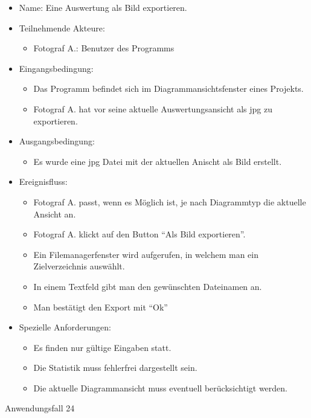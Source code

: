 \begin{itemize}
\item Name: Eine Auswertung als Bild exportieren.
\item Teilnehmende Akteure:
\begin{itemize}
\item Fotograf A.: Benutzer des Programms
\end{itemize}
\item Eingangsbedingung:
\begin{itemize}
\item Das Programm befindet sich im Diagrammansichtsfenster eines Projekts.
\item Fotograf A. hat vor seine aktuelle Auswertungsansicht als \gls{jpg} zu exportieren.
\end{itemize}
\item Ausgangsbedingung:
\begin{itemize}
\item Es wurde eine \gls{jpg} Datei mit der aktuellen Anischt als Bild erstellt.
\end{itemize}
\item Ereignisfluss:
\begin{itemize}
\item Fotograf A. passt, wenn es Möglich ist, je nach Diagrammtyp die aktuelle Ansicht an.
\item Fotograf A. klickt auf den Button "`Als Bild exportieren"'.
\item Ein Filemanagerfenster wird aufgerufen, in welchem man ein Zielverzeichnis auswählt.
\item In einem Textfeld gibt man den gewünschten Dateinamen an.
\item Man bestätigt den Export mit "`Ok"' 
\end{itemize}
\item Spezielle Anforderungen:
\begin{itemize}
\item Es finden nur gültige Eingaben statt.
\item Die Statistik muss fehlerfrei dargestellt sein.
\item Die aktuelle Diagrammansicht muss eventuell berücksichtigt werden.
\end{itemize}
\end{itemize}
 
\begin{description}
\item[Anwendungsfall 24]
\end{description}
 
